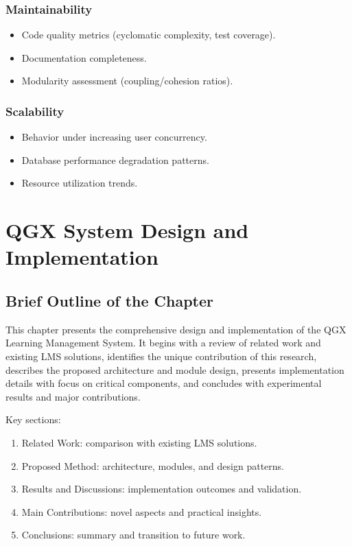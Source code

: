 \documentclass[11pt,a4paper]{article}
\begin{document}
\subsubsection{Maintainability}

\begin{itemize}
    \item Code quality metrics (cyclomatic complexity, test coverage).
    \item Documentation completeness.
    \item Modularity assessment (coupling/cohesion ratios).
\end{itemize}

\subsubsection{Scalability}

\begin{itemize}
    \item Behavior under increasing user concurrency.
    \item Database performance degradation patterns.
    \item Resource utilization trends.
\end{itemize}


\newpage
\section{QGX System Design and Implementation}

\subsection{Brief Outline of the Chapter}

This chapter presents the comprehensive design and implementation of the QGX Learning Management System. It begins with a review of related work and existing LMS solutions, identifies the unique contribution of this research, describes the proposed architecture and module design, presents implementation details with focus on critical components, and concludes with experimental results and major contributions.

Key sections:

\begin{enumerate}
    \item Related Work: comparison with existing LMS solutions.
    \item Proposed Method: architecture, modules, and design patterns.
    \item Results and Discussions: implementation outcomes and validation.
    \item Main Contributions: novel aspects and practical insights.
    \item Conclusions: summary and transition to future work.
\end{enumerate}
\end{document}

